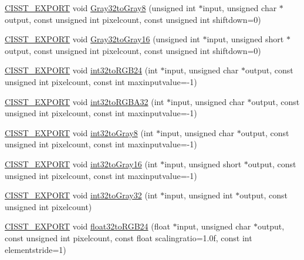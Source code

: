 \begin{DoxyCompactItemize}
\item 
\hyperlink{cmn_export_macros_8h_a99393e0c3ac434b2605235bbe20684f8}{C\-I\-S\-S\-T\-\_\-\-E\-X\-P\-O\-R\-T} void \hyperlink{namespacesvl_converter_ae99214e89a1b6e46cbe528763adcb19f}{Gray32to\-Gray8} (unsigned int $\ast$input, unsigned char $\ast$output, const unsigned int pixelcount, const unsigned int shiftdown=0)
\item 
\hyperlink{cmn_export_macros_8h_a99393e0c3ac434b2605235bbe20684f8}{C\-I\-S\-S\-T\-\_\-\-E\-X\-P\-O\-R\-T} void \hyperlink{namespacesvl_converter_a99f79c3fccd8441e34cdfad39014dad8}{Gray32to\-Gray16} (unsigned int $\ast$input, unsigned short $\ast$output, const unsigned int pixelcount, const unsigned int shiftdown=0)
\item 
\hyperlink{cmn_export_macros_8h_a99393e0c3ac434b2605235bbe20684f8}{C\-I\-S\-S\-T\-\_\-\-E\-X\-P\-O\-R\-T} void \hyperlink{namespacesvl_converter_a3211679e1d1d7be6d1557b0aa1d3d779}{int32to\-R\-G\-B24} (int $\ast$input, unsigned char $\ast$output, const unsigned int pixelcount, const int maxinputvalue=-\/1)
\item 
\hyperlink{cmn_export_macros_8h_a99393e0c3ac434b2605235bbe20684f8}{C\-I\-S\-S\-T\-\_\-\-E\-X\-P\-O\-R\-T} void \hyperlink{namespacesvl_converter_ac3ca2f47eb7716449255c4c7974d5878}{int32to\-R\-G\-B\-A32} (int $\ast$input, unsigned char $\ast$output, const unsigned int pixelcount, const int maxinputvalue=-\/1)
\item 
\hyperlink{cmn_export_macros_8h_a99393e0c3ac434b2605235bbe20684f8}{C\-I\-S\-S\-T\-\_\-\-E\-X\-P\-O\-R\-T} void \hyperlink{namespacesvl_converter_a1580d5d542d6f54bc898be8a395c0f14}{int32to\-Gray8} (int $\ast$input, unsigned char $\ast$output, const unsigned int pixelcount, const int maxinputvalue=-\/1)
\item 
\hyperlink{cmn_export_macros_8h_a99393e0c3ac434b2605235bbe20684f8}{C\-I\-S\-S\-T\-\_\-\-E\-X\-P\-O\-R\-T} void \hyperlink{namespacesvl_converter_ad912afac82a226820a273026e5670717}{int32to\-Gray16} (int $\ast$input, unsigned short $\ast$output, const unsigned int pixelcount, const int maxinputvalue=-\/1)
\item 
\hyperlink{cmn_export_macros_8h_a99393e0c3ac434b2605235bbe20684f8}{C\-I\-S\-S\-T\-\_\-\-E\-X\-P\-O\-R\-T} void \hyperlink{namespacesvl_converter_aa0d1a923946a169960afe1d3b077bd68}{int32to\-Gray32} (int $\ast$input, unsigned int $\ast$output, const unsigned int pixelcount)
\item 
\hyperlink{cmn_export_macros_8h_a99393e0c3ac434b2605235bbe20684f8}{C\-I\-S\-S\-T\-\_\-\-E\-X\-P\-O\-R\-T} void \hyperlink{namespacesvl_converter_a3e66066016ffa0ae6029f46d48ab578b}{float32to\-R\-G\-B24} (float $\ast$input, unsigned char $\ast$output, const unsigned int pixelcount, const float scalingratio=1.\-0f, const int elementstride=1)

\end{DoxyCompactItemize}
